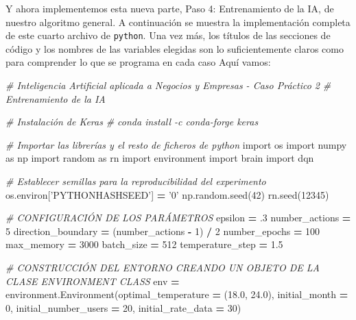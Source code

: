 \documentclass[]{book}
\newenvironment{Shaded}{\begin{snugshade}}{\end{snugshade}}
\newcommand{\CommentTok}[1]{\textcolor[rgb]{0.56,0.35,0.01}{\textit{#1}}}
\newcommand{\DecValTok}[1]{\textcolor[rgb]{0.00,0.00,0.81}{#1}}
\newcommand{\FloatTok}[1]{\textcolor[rgb]{0.00,0.00,0.81}{#1}}
\newcommand{\ImportTok}[1]{#1}
\newcommand{\NormalTok}[1]{#1}
\newcommand{\OperatorTok}[1]{\textcolor[rgb]{0.81,0.36,0.00}{\textbf{#1}}}
\newcommand{\StringTok}[1]{\textcolor[rgb]{0.31,0.60,0.02}{#1}}
\begin{document}
Y ahora implementemos esta nueva parte, Paso 4: Entrenamiento de la IA, de nuestro algoritmo general. A continuación se muestra la implementación completa de este cuarto archivo de \texttt{python}. Una vez más, los títulos de las secciones de código y los nombres de las variables elegidas son lo suficientemente claros como para comprender lo que se programa en cada caso Aquí vamos:

\begin{Shaded}
\begin{Highlighting}[]
\CommentTok{# Inteligencia Artificial aplicada a Negocios y Empresas - Caso Práctico 2}
\CommentTok{# Entrenamiento de la IA}

\CommentTok{# Instalación de Keras}
\CommentTok{# conda install -c conda-forge keras}

\CommentTok{# Importar las librerías y el resto de ficheros de python}
\ImportTok{import}\NormalTok{ os}
\ImportTok{import}\NormalTok{ numpy }\ImportTok{as}\NormalTok{ np}
\ImportTok{import}\NormalTok{ random }\ImportTok{as}\NormalTok{ rn}
\ImportTok{import}\NormalTok{ environment}
\ImportTok{import}\NormalTok{ brain}
\ImportTok{import}\NormalTok{ dqn}

\CommentTok{# Establecer semillas para la reproducibilidad del experimento}
\NormalTok{os.environ[}\StringTok{'PYTHONHASHSEED'}\NormalTok{] }\OperatorTok{=} \StringTok{'0'}
\NormalTok{np.random.seed(}\DecValTok{42}\NormalTok{)}
\NormalTok{rn.seed(}\DecValTok{12345}\NormalTok{)}

\CommentTok{# CONFIGURACIÓN DE LOS PARÁMETROS}
\NormalTok{epsilon }\OperatorTok{=} \FloatTok{.3}
\NormalTok{number_actions }\OperatorTok{=} \DecValTok{5}
\NormalTok{direction_boundary }\OperatorTok{=}\NormalTok{ (number_actions }\OperatorTok{-} \DecValTok{1}\NormalTok{) }\OperatorTok{/} \DecValTok{2}
\NormalTok{number_epochs }\OperatorTok{=} \DecValTok{100}
\NormalTok{max_memory }\OperatorTok{=} \DecValTok{3000}
\NormalTok{batch_size }\OperatorTok{=} \DecValTok{512}
\NormalTok{temperature_step }\OperatorTok{=} \FloatTok{1.5}

\CommentTok{# CONSTRUCCIÓN DEL ENTORNO CREANDO UN OBJETO DE LA CLASE ENVIRONMENT CLASS}
\NormalTok{env }\OperatorTok{=}\NormalTok{ environment.Environment(optimal_temperature }\OperatorTok{=}\NormalTok{ (}\FloatTok{18.0}\NormalTok{, }\FloatTok{24.0}\NormalTok{),}
\NormalTok{                              initial_month }\OperatorTok{=} \DecValTok{0}\NormalTok{,}
\NormalTok{                              initial_number_users }\OperatorTok{=} \DecValTok{20}\NormalTok{,}
\NormalTok{                              initial_rate_data }\OperatorTok{=} \DecValTok{30}\NormalTok{)}


\end{Highlighting}
\end{Shaded}
\end{document}
